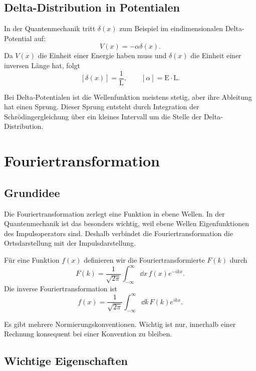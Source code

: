 \subsection{Delta-Distribution in Potentialen}

In der Quantenmechanik tritt $\delta(x)$ zum Beispiel im eindimensionalen Delta-Potential auf:
\[
    V(x)=-\alpha\delta(x).
\]
Da $V(x)$ die Einheit einer Energie haben muss und $\delta(x)$ die Einheit einer inversen Länge hat, folgt
\[
    [\delta(x)]=\frac{1}{\mathrm{L}},
    \qquad [\alpha]=\mathrm{E}\cdot \mathrm{L}.
\]

\begin{examtipbox}
Bei Delta-Potentialen ist die Wellenfunktion meistens stetig, aber ihre Ableitung hat einen Sprung. Dieser Sprung entsteht durch Integration der Schrödingergleichung über ein kleines Intervall um die Stelle der Delta-Distribution.
\end{examtipbox}

\section{Fouriertransformation}

\subsection{Grundidee}

Die Fouriertransformation zerlegt eine Funktion in ebene Wellen. In der Quantenmechanik ist das besonders wichtig, weil ebene Wellen Eigenfunktionen des Impulsoperators sind. Deshalb verbindet die Fouriertransformation die Ortsdarstellung mit der Impulsdarstellung.

\begin{definitionbox}
Für eine Funktion $f(x)$ definieren wir die Fouriertransformierte $F(k)$ durch
\[
    F(k)=\frac{1}{\sqrt{2\pi}}\int_{-\infty}^{\infty}\dd x\,f(x)e^{-ikx}.
\]
Die inverse Fouriertransformation ist
\[
    f(x)=\frac{1}{\sqrt{2\pi}}\int_{-\infty}^{\infty}\dd k\,F(k)e^{ikx}.
\]
\end{definitionbox}

Es gibt mehrere Normierungskonventionen. Wichtig ist nur, innerhalb einer Rechnung konsequent bei einer Konvention zu bleiben.

\subsection{Wichtige Eigenschaften}

